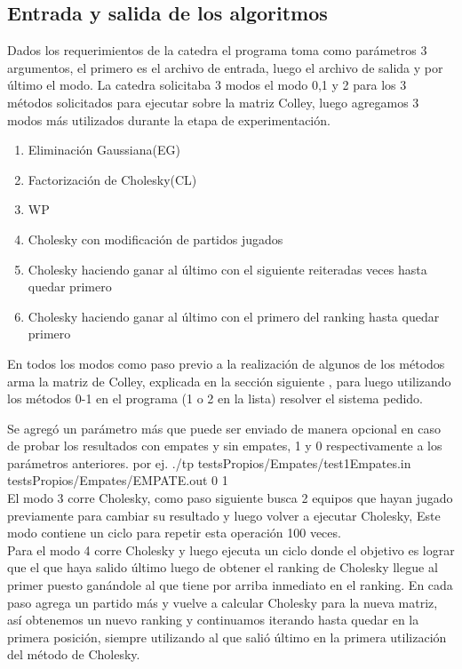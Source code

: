 \subsection{Entrada y salida de los algoritmos}

Dados los requerimientos de la catedra el programa toma como parámetros 3 argumentos, el primero es el archivo de entrada, luego el archivo de salida y
por \'ultimo el modo.  La catedra solicitaba 3 modos el modo 0,1 y 2 para los 3 métodos solicitados para ejecutar sobre la matriz Colley, luego agregamos 3 modos m\'as utilizados durante la etapa de experimentación.
\\
\begin{enumerate}
    \item Eliminaci\'on Gaussiana(EG)
    \item Factorizaci\'on de Cholesky(CL)
    \item WP
    \item Cholesky con modificación de partidos jugados
    \item Cholesky haciendo ganar al \'ultimo con el siguiente reiteradas veces hasta quedar primero
    \item Cholesky haciendo ganar al \'ultimo con el primero del ranking hasta quedar primero
\end{enumerate}
En todos los modos como paso previo a la realización de algunos de los métodos arma la matriz de Colley, explicada en la sección siguiente , para luego utilizando los métodos 0-1 en el programa (1 o 2 en la lista) resolver el sistema pedido.

Se agregó un parámetro más que puede ser enviado de manera opcional en caso de probar los resultados con empates y sin empates, 1 y 0 respectivamente a los parámetros anteriores.
por ej.
  ./tp testsPropios/Empates/test1Empates.in testsPropios/Empates/EMPATE.out 0 1
\\

El modo 3 corre Cholesky, como paso siguiente busca 2 equipos que hayan jugado previamente para cambiar su resultado y luego volver a ejecutar Cholesky,
Este modo contiene un ciclo para repetir esta operación 100 veces.
\\
Para el modo 4 corre Cholesky y luego ejecuta un ciclo donde el objetivo es lograr que el que haya salido \'ultimo luego de obtener el ranking de Cholesky llegue al primer puesto ganándole
al que tiene por arriba inmediato en el ranking. En cada paso agrega un partido m\'as y vuelve a calcular Cholesky para la nueva matriz, así obtenemos un nuevo ranking y continuamos iterando hasta quedar en la primera posición,
siempre utilizando al que salió último en la primera utilización del método de Cholesky.

